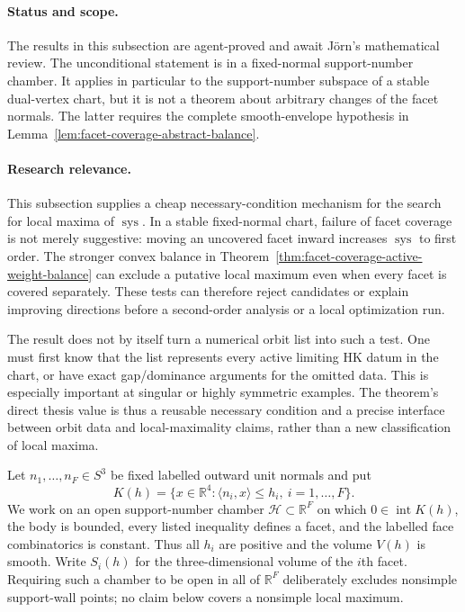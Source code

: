 \begin{unverified}
\paragraph{Status and scope.}
The results in this subsection are agent-proved and await Jörn's mathematical
review.  The unconditional statement is in a fixed-normal support-number
chamber.  It applies in particular to the support-number subspace of a stable
dual-vertex chart, but it is not a theorem about arbitrary changes of the
facet normals.  The latter requires the complete smooth-envelope hypothesis
in Lemma~\ref{lem:facet-coverage-abstract-balance}.

\paragraph{Research relevance.}
This subsection supplies a cheap necessary-condition mechanism for the search
for local maxima of \(\operatorname{sys}\).  In a stable fixed-normal chart,
failure of facet coverage is not merely suggestive: moving an uncovered facet
inward increases \(\operatorname{sys}\) to first order.  The stronger convex
balance in Theorem~\ref{thm:facet-coverage-active-weight-balance} can exclude a
putative local maximum even when every facet is covered separately.  These
tests can therefore reject candidates or explain improving directions before a
second-order analysis or a local optimization run.

The result does not by itself turn a numerical orbit list into such a test.
One must first know that the list represents every active limiting HK datum in
the chart, or have exact gap/dominance arguments for the omitted data.  This is
especially important at singular or highly symmetric examples.  The theorem's
direct thesis value is thus a reusable necessary condition and a precise
interface between orbit data and local-maximality claims, rather than a new
classification of local maxima.

Let $n_1,\ldots,n_F\in S^3$ be fixed labelled outward unit normals and put
\[
  K(h)=\{x\in\mathbb R^4:\langle n_i,x\rangle\leq h_i,
       \ i=1,\ldots,F\}.
\]
We work on an open support-number chamber $\mathcal H\subset\mathbb R^F$ on
which $0\in\operatorname{int}K(h)$, the body is bounded, every listed
inequality defines a facet, and the labelled face combinatorics is constant.
Thus all $h_i$ are positive and the volume $V(h)$ is smooth.  Write $S_i(h)$
for the three-dimensional volume of the $i$th facet.  Requiring such a chamber
to be open in all of $\mathbb R^F$ deliberately excludes nonsimple
support-wall points; no claim below covers a nonsimple local maximum.


\end{unverified}
